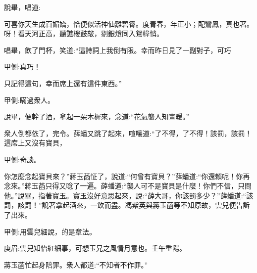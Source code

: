 \begin{parag}
    說畢，唱道:
\end{parag}

\begin{qute2sp}
    \begin{poem}
        \begin{pl}可喜你天生成百媚嬌，恰便似活神仙離碧霄。度青春，年正小；配鸞鳳，真也著。呀！看天河正高，聽譙樓鼓敲，剔銀燈同入鴛幃悄。\end{pl}
    \end{poem}
\end{qute2sp}


\begin{parag}
    唱畢，飲了門杯，笑道:“這詩詞上我倒有限。幸而昨日見了一副對子，可巧\begin{note}甲側:真巧！\end{note}只記得這句，幸而席上還有這件東西。”\begin{note}甲側:瞞過衆人。\end{note}說畢，便幹了酒，拿起一朵木樨來，念道:“花氣襲人知晝暖。”
\end{parag}


\begin{parag}
    衆人倒都依了，完令。薛蟠又跳了起來，喧嚷道:“了不得，了不得！該罰，該罰！這席上又沒有寶貝，\begin{note}甲側:奇談。\end{note}你怎麼念起寶貝來？”蔣玉菡怔了，說道:“何曾有寶貝？”薛蟠道:“你還賴呢！你再念來。”蔣玉菡只得又唸了一遍。薛蟠道:“襲人可不是寶貝是什麼！你們不信，只問他。”說畢，指著寶玉。寶玉沒好意思起來，說:“薛大哥，你該罰多少？”薛蟠道:“該罰，該罰！”說著拿起酒來，一飲而盡。馮紫英與蔣玉菡等不知原故，雲兒便告訴了出來。\begin{note}甲側:用雲兒細說，的是章法。\end{note}\begin{note}庚眉:雲兒知怡紅細事，可想玉兄之風情月意也。壬午重陽。\end{note}蔣玉菡忙起身陪罪。衆人都道:“不知者不作罪。”
\end{parag}


